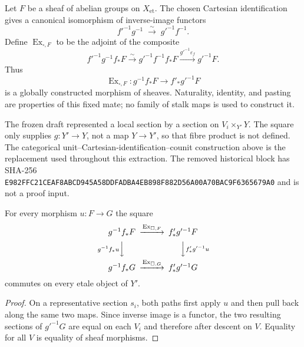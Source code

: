 \begin{definition}
\label{def:weil-pbc-underived-exchange}
\leanok
Let $F$ be a sheaf of abelian groups on $X_{\mathrm{et}}$.  The chosen
Cartesian identification gives a canonical isomorphism of inverse-image
functors
\[
 f'^{-1}g^{-1}\;\xrightarrow{\sim}\;g'^{-1}f^{-1}.
\]
Define $\operatorname{Ex}_{\square,F}$ to be the adjoint of the composite
\[
 f'^{-1}g^{-1}f_*F
 \xrightarrow{\sim}g'^{-1}f^{-1}f_*F
 \xrightarrow{g'^{-1}\varepsilon_f}g'^{-1}F.
\]
Thus
\[
 \operatorname{Ex}_{\square,F}:g^{-1}f_*F\longrightarrow
 f'_*g'^{-1}F
\]
is a globally constructed morphism of sheaves.  Naturality, identity, and
pasting are properties of this fixed mate; no family of stalk maps is used to
construct it.
\end{definition}

\begin{warning}
The frozen draft represented a local section by a section on
$V_i\times_{Y'}Y$.  The square only supplies $g:Y'\to Y$, not a map
$Y\to Y'$, so that fibre product is not defined.  The categorical
unit--Cartesian-identification--counit construction above is the replacement
used throughout this extraction.  The removed historical block has SHA-256
\texttt{E982FFC21CEAF8ABCD945A58DDFADBA4EB898F882D56A00A70BAC9F6365679A0} and is not a proof input.
\end{warning}

\begin{lemma}
\label{lemma:weil-pbc-underived-exchange-naturality}
\leanok
For every morphism $u:F\to G$ the square
\[
\begin{CD}
 g^{-1}f_*F @>{\operatorname{Ex}_{\square,F}}>> f'_*g'^{-1}F\\
 @V{g^{-1}f_*u}VV @VV{f'_*g'^{-1}u}V\\
 g^{-1}f_*G @>{\operatorname{Ex}_{\square,G}}>> f'_*g'^{-1}G
\end{CD}
\]
commutes on every etale object of $Y'$.
\end{lemma}
\begin{proof}
\leanok
On a representative section $s_i$, both paths first apply $u$ and then
pull back along the same two maps.  Since inverse image is a functor, the two
resulting sections of $g'^{-1}G$ are equal on each $V_i$ and therefore after
descent on $V$.  Equality for all $V$ is equality of sheaf morphisms.
\end{proof}

